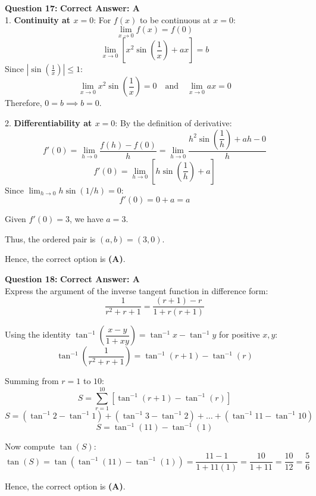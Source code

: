 \documentclass[11pt,a4paper]{article}
\begin{document}
\begin{tcolorbox}[solbox]
\textbf{\textcolor{primaryDark}{Question 17:}} \hfill \textbf{\textcolor{l1Green}{Correct Answer: A}}\\
\vspace{4pt}
1. \textbf{Continuity at $x = 0$}:
For $f(x)$ to be continuous at $x = 0$:
$$\lim_{x \to 0} f(x) = f(0)$$
$$\lim_{x \to 0} \left[ x^2 \sin\left(\frac{1}{x}\right) + ax \right] = b$$
Since $\left|\sin\left(\frac{1}{x}\right)\right| \le 1$:
$$\lim_{x \to 0} x^2 \sin\left(\frac{1}{x}\right) = 0 \quad \text{and} \quad \lim_{x \to 0} ax = 0$$
Therefore, $0 = b \implies b = 0$.

2. \textbf{Differentiability at $x = 0$}:
By the definition of derivative:
$$f'(0) = \lim_{h \to 0} \frac{f(h) - f(0)}{h} = \lim_{h \to 0} \frac{h^2 \sin\left(\dfrac{1}{h}\right) + ah - 0}{h}$$
$$f'(0) = \lim_{h \to 0} \left[ h \sin\left(\frac{1}{h}\right) + a \right]$$
Since $\lim_{h \to 0} h \sin(1/h) = 0$:
$$f'(0) = 0 + a = a$$

Given $f'(0) = 3$, we have $a = 3$.

Thus, the ordered pair is $(a, b) = (3, 0)$.

Hence, the correct option is \textbf{(A)}.
\end{tcolorbox}

\begin{tcolorbox}[solbox]
\textbf{\textcolor{primaryDark}{Question 18:}} \hfill \textbf{\textcolor{l1Green}{Correct Answer: A}}\\
\vspace{4pt}
Express the argument of the inverse tangent function in difference form:
$$\frac{1}{r^2 + r + 1} = \frac{(r + 1) - r}{1 + r(r + 1)}$$

Using the identity $\tan^{-1}\left(\dfrac{x - y}{1 + xy}\right) = \tan^{-1}x - \tan^{-1}y$ for positive $x, y$:
$$\tan^{-1}\left(\frac{1}{r^2 + r + 1}\right) = \tan^{-1}(r + 1) - \tan^{-1}(r)$$

Summing from $r = 1$ to $10$:
$$S = \sum_{r=1}^{10} \left[ \tan^{-1}(r + 1) - \tan^{-1}(r) \right]$$
$$S = (\tan^{-1}2 - \tan^{-1}1) + (\tan^{-1}3 - \tan^{-1}2) + \dots + (\tan^{-1}11 - \tan^{-1}10)$$
$$S = \tan^{-1}(11) - \tan^{-1}(1)$$

Now compute $\tan(S)$:
$$\tan(S) = \tan\left(\tan^{-1}(11) - \tan^{-1}(1)\right) = \frac{11 - 1}{1 + 11(1)} = \frac{10}{1 + 11} = \frac{10}{12} = \frac{5}{6}$$

Hence, the correct option is \textbf{(A)}.
\end{tcolorbox}
\end{document}
